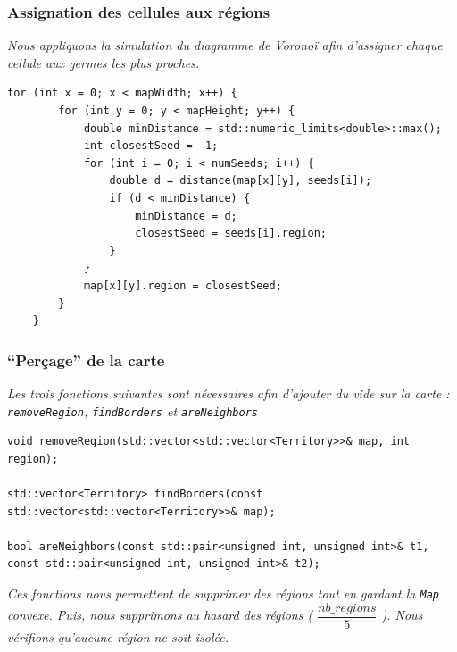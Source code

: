 \documentclass[french,nochapter,11pt]{RapportProjet}
\begin{document}
\subsubsection{Assignation des cellules aux régions}
\textit{Nous appliquons la simulation du diagramme de Vorono\"i afin d'assigner chaque cellule aux germes les plus proches.}
\begin{lstlisting}[style=CPPStyle]
    for (int x = 0; x < mapWidth; x++) {
        for (int y = 0; y < mapHeight; y++) {
            double minDistance = std::numeric_limits<double>::max();
            int closestSeed = -1;
            for (int i = 0; i < numSeeds; i++) {
                double d = distance(map[x][y], seeds[i]);
                if (d < minDistance) {
                    minDistance = d;
                    closestSeed = seeds[i].region;
                }
            }
            map[x][y].region = closestSeed;
        }
    }
\end{lstlisting}

\subsubsection{\enquote{Perçage} de la carte}
\textit{Les trois fonctions suivantes sont nécessaires afin d'ajouter du vide sur la carte : 
\texttt{removeRegion}, \texttt{findBorders} et \texttt{areNeighbors}}

\begin{lstlisting}[style=CPPStyle]
void removeRegion(std::vector<std::vector<Territory>>& map, int region);

std::vector<Territory> findBorders(const std::vector<std::vector<Territory>>& map);

bool areNeighbors(const std::pair<unsigned int, unsigned int>& t1, const std::pair<unsigned int, unsigned int>& t2);
\end{lstlisting}

\textit{Ces fonctions nous permettent de supprimer des régions tout en gardant la \texttt{Map} convexe.
Puis, nous supprimons au hasard des régions ( $\dfrac{nb\_regions}{5}$ ).
Nous vérifions qu'aucune région ne soit isolée.}
\end{document}
